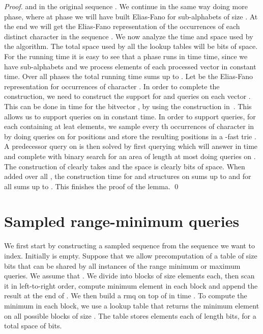 \documentclass[11pt,runningheads]{llncs}
\begin{document}
{\begin{proof}
 and  in the original sequence . We continue in the same way doing  more phase, where at phase  we will have built Elias-Fano for sub-alphabets of size . At the end we will get the Elias-Fano representation of the occurrences of each distinct character in the sequence . 
We now analyze the time and space used by the algorithm. 
The total space used by all the  lookup tables will be  bits of space. For the running time it is easy to see that a phase  runs in time  time, since we have  sub-alphabets and we process  elements of each processed vector in constant time. Over all  phases the total running 
time sums up to . 
Let  be the Elias-Fano representation for occurrences of character . 
In order to complete the construction, we need to construct the support for  and  
queries on each vector . This can be done in time  for the bitvector , by using the construction in~\cite{BGKS15}. This allows us to support  queries on  in constant time. 
In order to support  queries, for each  containing at leat  elements, we sample every th occurrences of character  in  by doing  queries on  for positions  and store the resulting positions in a -fast trie . A predecessor query on  is then solved by first querying  which will answer in time  and complete with binary search for an area of length at most  doing   queries on . The construction of  clearly takes  and the space is clearly  bits of space. When added over all , the construction time for  and  structures on  sums up to  and for all  sums up to . This finishes the proof of the lemma.  
\qed
\end{proof} 

\section{Sampled range-minimum queries}
\label{sec:sampled_rmq}
We first start by constructing a sampled sequence  from the sequence  we want to index. 
Initially  is empty. Suppose that we allow  precomputation of a table of size  bits 
that can be shared by all instances of the range minimum or maximum queries. We assume that . 
We divide  into blocks of size  elements each, then scan it in left-to-right order, compute minimum element in each block and append the result at the end of . We then build 
a rmq  on top of  in time . To compute the minimum in each block, 
we use a lookup table that returns the minimum element on all possible blocks of size . The table stores  
elements each of length  bits, for a total space of  bits. 

}
\end{document}
